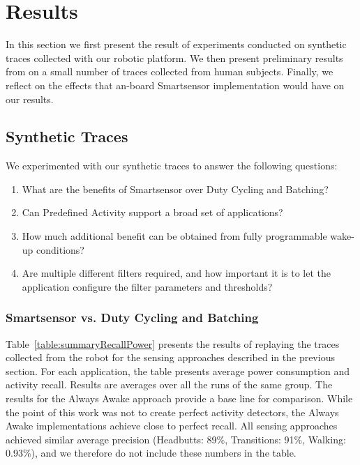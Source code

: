 


\section{Results}
\label{sec:results}

In this section we first present the result of experiments conducted
on synthetic traces collected with our robotic platform.  We then
present preliminary results from on a small number of traces collected
from human subjects.  Finally, we reflect on the effects that an-board
Smartsensor implementation would have on our results.

\subsection{Synthetic Traces}

We experimented with our synthetic traces to answer the following questions:

\begin{enumerate}
\setlength{\itemsep}{-3pt}  

\item What are the benefits of Smartsensor over Duty Cycling and
  Batching?

\item Can Predefined Activity support a broad set of applications?

\item How much additional benefit can be obtained from fully
  programmable wake-up conditions?

\item Are multiple different filters required, and how important it is
  to let the application configure the filter parameters and
  thresholds?

\end{enumerate}

\subsubsection{Smartsensor vs. Duty Cycling and Batching}

Table~\ref{table:summaryRecallPower} presents the results of replaying
the traces collected from the robot for the sensing approaches
described in the previous section.  For each application, the table
presents average power consumption and activity recall.  Results are
averages over all the runs of the same group.  The results for the
Always Awake approach provide a base line for comparison.  While the
point of this work was not to create perfect activity detectors, the
Always Awake implementations achieve close to perfect recall.  All
sensing approaches achieved similar average precision (Headbutts:
89\%, Transitions: 91\%, Walking: 0.93\%), and we therefore do not
include these numbers in the table.

